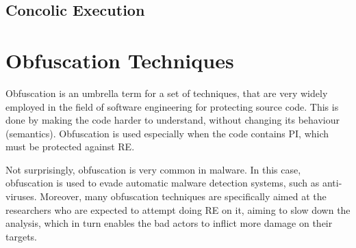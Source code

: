 \subsection{Concolic Execution} %


\section{Obfuscation Techniques}


Obfuscation is an umbrella term for a set of techniques, that are very widely employed in the field of software engineering for protecting source code. This is done by making the code harder to understand, without changing its behaviour (semantics). Obfuscation is used especially when the code contains \gls{PI}, which must be protected against \gls{RE}. 

Not surprisingly, obfuscation is very common in malware. In this case, obfuscation is used to evade automatic malware detection systems, such as anti-viruses. Moreover, many obfuscation techniques are specifically aimed at the researchers who are expected to attempt doing \gls{RE} on it, aiming to slow down the analysis, which in turn enables the bad actors to inflict more damage on their targets. \cite{zeusvm} 


